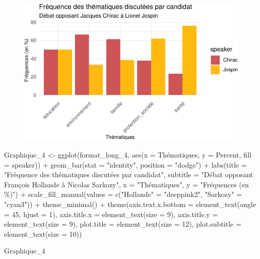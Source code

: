 \documentclass[
  letterpaper,
  DIV=11,
  numbers=noendperiod]{scrartcl}
\newenvironment{Shaded}{\begin{snugshade}}{\end{snugshade}}
\newcommand{\AttributeTok}[1]{\textcolor[rgb]{0.40,0.45,0.13}{#1}}
\newcommand{\DecValTok}[1]{\textcolor[rgb]{0.68,0.00,0.00}{#1}}
\newcommand{\FunctionTok}[1]{\textcolor[rgb]{0.28,0.35,0.67}{#1}}
\newcommand{\NormalTok}[1]{\textcolor[rgb]{0.00,0.23,0.31}{#1}}
\newcommand{\OtherTok}[1]{\textcolor[rgb]{0.00,0.23,0.31}{#1}}
\newcommand{\SpecialCharTok}[1]{\textcolor[rgb]{0.37,0.37,0.37}{#1}}
\newcommand{\StringTok}[1]{\textcolor[rgb]{0.13,0.47,0.30}{#1}}
\begin{document}
\begin{figure}[H]

{\centering \includegraphics{Travail-Session_files/figure-pdf/unnamed-chunk-2-3.pdf}

}

\end{figure}

\begin{Shaded}
\begin{Highlighting}[]
\NormalTok{Graphique\_4 }\OtherTok{\textless{}{-}} \FunctionTok{ggplot}\NormalTok{(format\_long\_4, }\FunctionTok{aes}\NormalTok{(}\AttributeTok{x =}\NormalTok{ Thématiques, }\AttributeTok{y =}\NormalTok{ Percent, }\AttributeTok{fill =}\NormalTok{ speaker)) }\SpecialCharTok{+} \FunctionTok{geom\_bar}\NormalTok{(}\AttributeTok{stat =} \StringTok{"identity"}\NormalTok{, }\AttributeTok{position =} \StringTok{"dodge"}\NormalTok{) }\SpecialCharTok{+} \FunctionTok{labs}\NormalTok{(}\AttributeTok{title =} \StringTok{"Fréquence des thématiques discutées par candidat"}\NormalTok{, }\AttributeTok{subtitle =} \StringTok{"Débat opposant François Hollande à Nicolas Sarkozy"}\NormalTok{, }\AttributeTok{x =} \StringTok{"Thématiques"}\NormalTok{, }\AttributeTok{y =} \StringTok{"Fréquences (en \%)"}\NormalTok{) }\SpecialCharTok{+} \FunctionTok{scale\_fill\_manual}\NormalTok{(}\AttributeTok{values =} \FunctionTok{c}\NormalTok{(}\StringTok{"Hollande"} \OtherTok{=} \StringTok{"deeppink2"}\NormalTok{, }\StringTok{"Sarkozy"} \OtherTok{=} \StringTok{"cyan3"}\NormalTok{)) }\SpecialCharTok{+} \FunctionTok{theme\_minimal}\NormalTok{() }\SpecialCharTok{+} \FunctionTok{theme}\NormalTok{(}\AttributeTok{axis.text.x.bottom =} \FunctionTok{element\_text}\NormalTok{(}\AttributeTok{angle =} \DecValTok{45}\NormalTok{, }\AttributeTok{hjust =} \DecValTok{1}\NormalTok{), }\AttributeTok{axis.title.x =} \FunctionTok{element\_text}\NormalTok{(}\AttributeTok{size =} \DecValTok{9}\NormalTok{), }\AttributeTok{axis.title.y =} \FunctionTok{element\_text}\NormalTok{(}\AttributeTok{size =} \DecValTok{9}\NormalTok{), }\AttributeTok{plot.title =} \FunctionTok{element\_text}\NormalTok{(}\AttributeTok{size =} \DecValTok{12}\NormalTok{), }\AttributeTok{plot.subtitle =} \FunctionTok{element\_text}\NormalTok{(}\AttributeTok{size =} \DecValTok{10}\NormalTok{))}

\NormalTok{Graphique\_4}
\end{Highlighting}
\end{Shaded}
\end{document}
